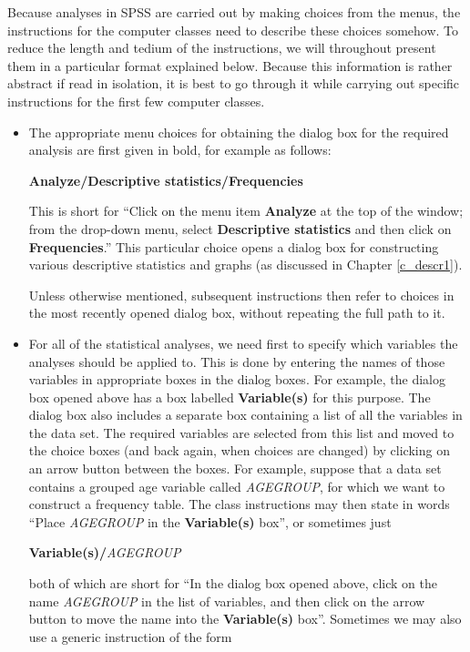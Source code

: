Because analyses in SPSS are carried out by making choices from the
menus, the instructions for the computer classes need to describe these
choices somehow. To reduce the length and tedium of the instructions, we
will throughout present them in a particular format explained below.
Because this information is rather abstract if read in isolation, it is best to
go through it while carrying out specific instructions for the first few
computer classes.
\begin{itemize}
\item
The appropriate menu choices for obtaining the dialog box for the
required analysis are first given in bold, for example as
follows:

\textbf{Analyze/Descriptive statistics/Frequencies}

This is short for ``Click on the menu item \textbf{Analyze} at the top
of the window; from the drop-down menu, select \textbf{Descriptive
statistics} and then click on \textbf{Frequencies}.'' This particular
choice opens a dialog box for constructing various descriptive
statistics and graphs (as discussed in Chapter \ref{c_descr1}).

Unless otherwise mentioned, subsequent instructions then refer to
choices in the most recently opened dialog box, without repeating the
full path to it.
\item
For all of the statistical analyses, we need first to specify which
variables the analyses should be applied to. This is done by entering
the names of those variables in appropriate boxes in the dialog boxes.
For example, the dialog box opened above has a box labelled
\textbf{Variable(s)} for this purpose. The dialog box also includes a
separate box containing a list of all the variables in the data set. The
required variables are selected from this list and moved to the choice
boxes (and back again, when choices are changed) by clicking on an arrow
button between the boxes. For example, suppose that a data set contains
a grouped age variable called \emph{AGEGROUP}, for which we want to construct a
frequency table. The class instructions may then state in words ``Place
\emph{AGEGROUP} in the \textbf{Variable(s)} box'', or sometimes just

\textbf{Variable(s)/}\emph{AGEGROUP}

both of which are short for ``In the dialog box opened above, click on
the name \emph{AGEGROUP} in the list of variables, and then click on the
arrow button to move the name into the \textbf{Variable(s)} box''.
Sometimes we may also use a generic instruction of the form


\end{itemize}
